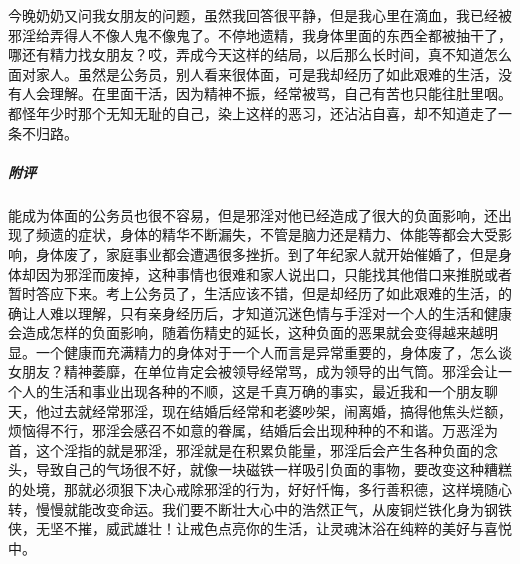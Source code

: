 \begin{case}
    今晚奶奶又问我女朋友的问题，虽然我回答很平静，但是我心里在滴血，我已经被邪淫给弄得人不像人鬼不像鬼了。不停地遗精，我身体里面的东西全都被抽干了，哪还有精力找女朋友？哎，弄成今天这样的结局，以后那么长时间，真不知道怎么面对家人。虽然是公务员，别人看来很体面，可是我却经历了如此艰难的生活，没有人会理解。在里面干活，因为精神不振，经常被骂，自己有苦也只能往肚里咽。都怪年少时那个无知无耻的自己，染上这样的恶习，还沾沾自喜，却不知道走了一条不归路。
    \subparagraph{附评} 能成为体面的公务员也很不容易，但是邪淫对他已经造成了很大的负面影响，还出现了频遗的症状，身体的精华不断漏失，不管是脑力还是精力、体能等都会大受影响，身体废了，家庭事业都会遭遇很多挫折。到了年纪家人就开始催婚了，但是身体却因为邪淫而废掉，这种事情也很难和家人说出口，只能找其他借口来推脱或者暂时答应下来。考上公务员了，生活应该不错，但是却经历了如此艰难的生活，的确让人难以理解，只有亲身经历后，才知道沉迷色情与手淫对一个人的生活和健康会造成怎样的负面影响，随着伤精史的延长，这种负面的恶果就会变得越来越明显。一个健康而充满精力的身体对于一个人而言是异常重要的，身体废了，怎么谈女朋友？精神萎靡，在单位肯定会被领导经常骂，成为领导的出气筒。邪淫会让一个人的生活和事业出现各种的不顺，这是千真万确的事实，最近我和一个朋友聊天，他过去就经常邪淫，现在结婚后经常和老婆吵架，闹离婚，搞得他焦头烂额，烦恼得不行，邪淫会感召不如意的眷属，结婚后会出现种种的不和谐。万恶淫为首，这个淫指的就是邪淫，邪淫就是在积累负能量，邪淫后会产生各种负面的念头，导致自己的气场很不好，就像一块磁铁一样吸引负面的事物，要改变这种糟糕的处境，那就必须狠下决心戒除邪淫的行为，好好忏悔，多行善积德，这样境随心转，慢慢就能改变命运。我们要不断壮大心中的浩然正气，从废铜烂铁化身为钢铁侠，无坚不摧，威武雄壮！让戒色点亮你的生活，让灵魂沐浴在纯粹的美好与喜悦中。
\end{case}


